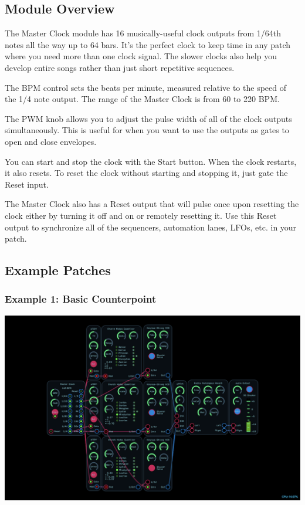 \documentclass[11pt]{book}
\begin{document}
\pagebreak

\begin{multicols*}{2}

\subsection*{Module Overview}

The Master Clock module has 16 musically-useful clock outputs from 1/64th notes all the way up to 64 bars. It's the perfect clock to keep time in any patch where you need more than one clock signal. The slower clocks also help you develop entire songs rather than just short repetitive sequences.

The BPM control sets the beats per minute, measured relative to the speed of the 1/4 note output. The range of the Master Clock is from 60 to 220 BPM.

The PWM knob allows you to adjust the pulse width of all of the clock outputs simultaneously. This is useful for when you want to use the outputs as gates to open and close envelopes.

You can start and stop the clock with the Start button. When the clock restarts, it also resets. To reset the clock without starting and stopping it, just gate the Reset input.

The Master Clock also has a Reset output that will pulse once upon resetting the clock either by turning it off and on or remotely resetting it. Use this Reset output to synchronize all of the sequencers, automation lanes, LFOs, etc. in your patch.

\subsection*{Example Patches}

\subsubsection*{Example 1: Basic Counterpoint}

\begin{center}
\includegraphics[width=0.95\linewidth]{master-clock-fig1.png}
\end{center}


\end{multicols*}
\end{document}
